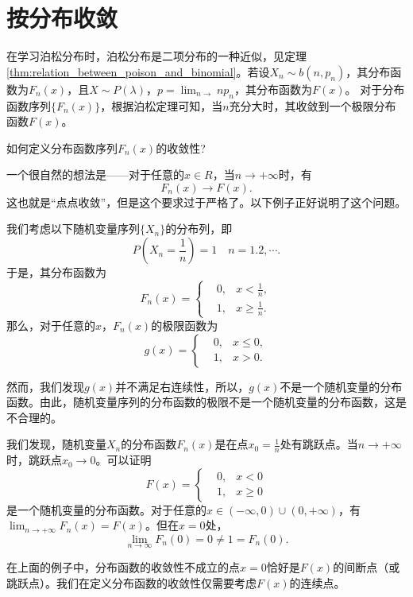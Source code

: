 \section{按分布收敛}
在学习泊松分布时，泊松分布是二项分布的一种近似，见定理\ref{thm:relation_between_poison_and_binomial}。若设$X_n \sim b(n,p_n)$，其分布函数为$F_n(x)$，且$X \sim P(\lambda)$，$p=\lim_{n\rightarrow} np_n$，其分布函数为$F(x)$。
   对于分布函数序列$\{F_n(x)\}$，根据泊松定理可知，当$n$充分大时，其收敛到一个极限分布函数$F(x)$。

   \begin{note}
        \vspace{3cm}
   \end{note}
\begin{problem}
   如何定义分布函数序列${F_n(x)}$的收敛性?
\end{problem}
一个很自然的想法是——对于任意的$x\in R$，当$n\rightarrow +\infty$时，有
$$
F_n(x) \rightarrow F(x). 
$$
这也就是“点点收敛”，但是这个要求过于严格了。以下例子正好说明了这个问题。

\begin{example}
我们考虑以下随机变量序列$\{X_n\}$的分布列，即
$$P\left(X_{n}=\frac{1}{n}\right)=1 \quad n=1.2, \cdots.$$
于是，其分布函数为
$$F_{n}(x)=\left\{\begin{aligned}
&0,& x<\frac{1}{n}, \\
&1,& x \geqslant \frac{1}{n}.
\end{aligned}\right.$$
那么，对于任意的$x$，$F_n(x)$的极限函数为
$$
g(x)=\left\{\begin{aligned}
&0, & x \leq 0, \\
&1, & x>0.
\end{aligned}\right.$$

然而，我们发现$g(x)$并不满足右连续性，所以，$g(x)$不是一个随机变量的分布函数。由此，随机变量序列的分布函数的极限不是一个随机变量的分布函数，这是不合理的。

我们发现，随机变量$X_n$的分布函数$F_n(x)$是在点$x_0=\frac{1}{n}$处有跳跃点。当$n \rightarrow +\infty$时，跳跃点$x_0 \rightarrow 0$。可以证明
$$
F(x)=\left\{\begin{aligned}
&0, & x<0 \\
&1, & x \geqslant 0
\end{aligned}\right. 
$$
是一个随机变量的分布函数。对于任意的$x \in (-\infty,0)\cup (0,+\infty)$，有$\lim_{n\rightarrow +\infty} F_n(x) = F(x)$。但在$x=0$处，
$$\lim _{n \rightarrow \infty} F_{n}(0)=0 \neq 1=F_{n}(0).$$
\end{example}
 \begin{remark}
 在上面的例子中，分布函数的收敛性不成立的点$x=0$恰好是$F(x)$的间断点（或跳跃点）。我们在定义分布函数的收敛性仅需要考虑$F(x)$的连续点。
 \end{remark}


